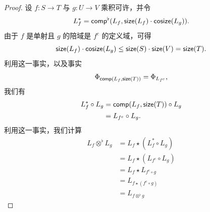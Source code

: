 \begin{proof} 设 $f:S \to T$ 与 $g:U \to V$ 乘积可许，并令
    \[
    L_f^* = \mathsf{comp}^\flat(L_f,\mathsf{size}(L_f)\cdot \mathsf{cosize}(L_g)).
    \]
    由于 $f$ 是单射且 $g$ 的陪域是 $f^c$ 的定义域，可得
    \[\mathsf{size}(L_f) \cdot \mathsf{cosize}(L_g) \leq \mathsf{size}(S) \cdot \mathsf{size}(V) = \mathsf{size}(T).\]
    利用这一事实，以及事实
    \[\Phi_{\mathsf{comp}(L_f,\mathsf{size}(T))} = \Phi_{L_{f^c}},\]
    我们有
    \begin{align*}
    L_f^* \circ L_g & = \mathsf{comp}(L_f,\mathsf{size}(T)) \circ L_g\\
    & = L_{f^c} \circ L_g.
    \end{align*}
    利用这一事实，我们计算 
    \begin{align*}
        L_f \otimes^\flat L_g & = L_f \star (L_f^* \circ L_g)\\
        & = L_f \star (L_{f^c} \circ L_g)\\
        & = L_f \star L_{f^c \circ g}\\
        & = L_{f \star (f^c \circ g)}\\
        & = L_{f \otimes^\flat g}
    \end{align*}
\end{proof}


\newpage 








\newpage
